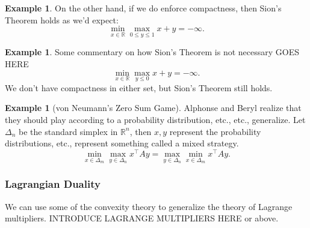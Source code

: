 \documentclass{article}
\numberwithin{equation}{section}
\theoremstyle{definition}
\newtheorem{example}[theorem]{Example}
\newcommand{\bR}{\mathbb{R}}
\begin{document}
\begin{example}
    On the other hand, if we do enforce compactness, then Sion's Theorem holds as we'd expect:
    \begin{equation}
        \min_{x\in\bR}\max_{0\le y\le 1} x+y=-\infty.
    \end{equation}
\end{example}
\begin{example}
    Some commentary on how Sion's Theorem is not necessary GOES HERE
    \begin{equation}
        \min_{x\in\bR}\max_{y\le 0} x+y=-\infty.
    \end{equation}
    We don't have compactness in either set, but Sion's Theorem still holds.
\end{example}
\begin{example}[von Neumann's Zero Sum Game]
    Alphonse and Beryl realize that they should play according to a probability distribution, etc., etc., generalize. Let $\Delta_n$ be the standard simplex in $\bR^n$, then $x, y$ represent the probability distributions, etc., represent something called a mixed strategy.
    \begin{equation}
         \min_{x\in\Delta_m}\max_{y\in\Delta_n} x^\top Ay=\max_{y\in\Delta_n}\min_{x\in\Delta_m} x^\top Ay.
    \end{equation}
\end{example}
\subsubsection{Lagrangian Duality}
We can use some of the convexity theory to generalize the theory of Lagrange multipliers. INTRODUCE LAGRANGE MULTIPLIERS HERE or above.
\end{document}
